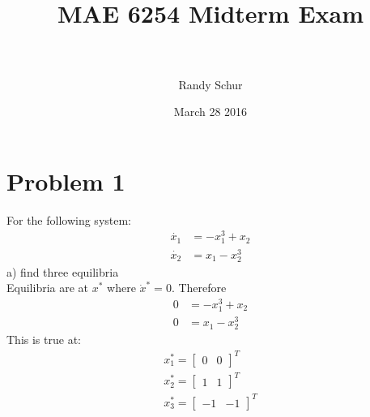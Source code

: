 \documentclass[paper=a4, fontsize=11pt]{scrartcl} %
\title{	
\normalfont \normalsize 
\horrule{0.5pt} \\[0.4cm] %
\huge MAE 6254 Midterm Exam \\ %
\horrule{2pt} \\[0.5cm] %
}
\author{Randy Schur} %
\date{\normalsize March 28 2016} %
\numberwithin{equation}{section} %
\numberwithin{figure}{section} %
\numberwithin{table}{section} %
\begin{document}
\maketitle %


\section{Problem 1}
For the following system: 
\begin{align*} 
\dot{x_1} &= -x_1^3 + x_2 \\
\dot{x_2} &= x_1 - x_2^3				
\end{align*}
a) find three equilibria \\

Equilibria are at $x^*$ where $\dot{x}^*=0$. Therefore 
\begin{align*}
0 &= -x_1^3 + x_2 \\
0 &= x_1 - x_2^3
\end{align*}
This is true at:
\begin{align}
x_1^* = \begin{bmatrix}0 & 0\end{bmatrix}^T \\
x_2^* = \begin{bmatrix}1 & 1\end{bmatrix}^T \\
x_3^* = \begin{bmatrix}-1 & -1\end{bmatrix}^T \\
\end{align}
\end{document}

